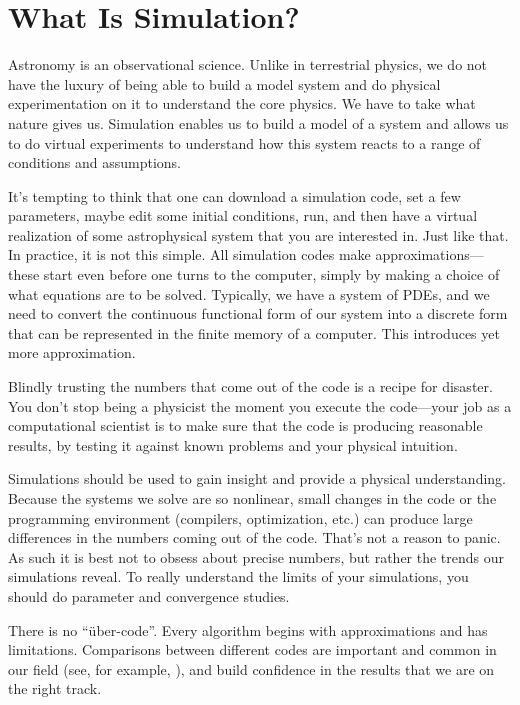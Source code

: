 \section{What Is Simulation?}

Astronomy is an observational science.  Unlike in terrestrial physics,
we do not have the luxury of being able to build a model system and do
physical experimentation on it to understand the core physics.  We
have to take what nature gives us.  Simulation enables us to build a
model of a system and allows us to do virtual experiments to
understand how this system reacts to a range of conditions and
assumptions.

It's tempting to think that one can download a simulation code, set a
few parameters, maybe edit some initial conditions, run, and then have
a virtual realization of some astrophysical system that you are
interested in.  Just like that.  In practice, it is not this simple.
All simulation codes make approximations---these start even before one
turns to the computer, simply by making a choice of what equations are
to be solved.  Typically, we have a system of PDEs, and we need to
convert the continuous functional form of our system into a discrete
form that can be represented in the finite memory of a computer.  This
introduces yet more approximation.


Blindly trusting the numbers that come out of the code is a recipe
for disaster.  You don't stop being a physicist the moment you execute
the code---your job as a computational scientist is to make sure that
the code is producing reasonable results, by testing it against known
problems and your physical intuition.

Simulations should be used to gain insight and provide a physical
understanding.  Because the systems we solve are so nonlinear, small
changes in the code or the programming environment (compilers,
optimization, etc.)  can produce large differences in the numbers
coming out of the code.  That's not a reason to panic.  As such it is
best not to obsess about precise numbers, but rather the trends our
simulations reveal.  To really understand the limits of your
simulations, you should do parameter and convergence studies.

There is no ``\"uber-code''.  Every algorithm begins with
approximations and has limitations.  Comparisons between different
codes are important and common in our field (see, for example,
\cite{frenk:1999,dimonte:2004,devalborro:2006}), and build confidence
in the results that we are on the right track.

